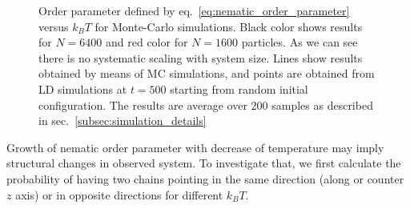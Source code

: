 \begin{figure}[h]
	\captionsetup{justification=centering, width=0.9\columnwidth}
	\caption{Order parameter defined by eq.~\eqref{eq:nematic_order_parameter} versus $k_BT$ for Monte-Carlo simulations. Black color shows results for $N = 6400$ and red color for $N = 1600$ particles. As we can see there is no systematic scaling with system size. Lines show results obtained by means of MC simulations, and points are obtained from LD simulations at $t = 500$ starting from random initial configuration. The results are average over $200$ samples as described in sec.~\ref{subsec:simulation_details}}
	\label{fig:op_kbt}
\end{figure}

Growth of nematic order parameter with decrease of temperature may imply structural changes in observed system. To investigate that, we first calculate the probability of having two chains pointing in the same direction (along or counter $z$ axis) or in opposite directions for different $k_BT$.

